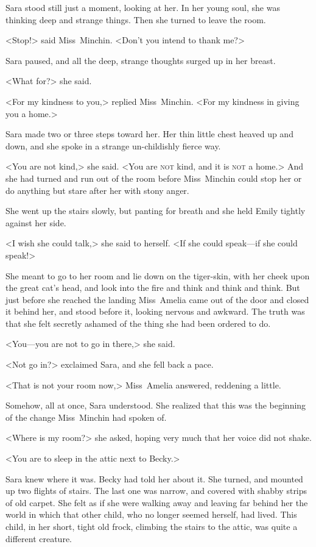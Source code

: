 Sara stood still just a moment, looking at her. In her young soul, she was thinking deep and strange things. Then she turned to leave the room.

<Stop!> said Miss~Minchin. <Don't you intend to thank me?>

Sara paused, and all the deep, strange thoughts surged up in her breast.

<What for?> she said.

<For my kindness to you,> replied Miss~Minchin. <For my kindness in giving you a home.>

Sara made two or three steps toward her. Her thin little chest heaved up and down, and she spoke in a strange un-childishly fierce way.

<You are not kind,> she said. <You are \textsc{not} kind, and it is \textsc{not} a home.> And she had turned and run out of the room before Miss~Minchin could stop her or do anything but stare after her with stony anger.

She went up the stairs slowly, but panting for breath and she held Emily tightly against her side.

<I wish she could talk,> she said to herself. <If she could speak—if she could speak!>

She meant to go to her room and lie down on the tiger-skin, with her cheek upon the great cat's head, and look into the fire and think and think and think. But just before she reached the landing Miss~Amelia came out of the door and closed it behind her, and stood before it, looking nervous and awkward. The truth was that she felt secretly ashamed of the thing she had been ordered to do.

<You—you are not to go in there,> she said.

<Not go in?> exclaimed Sara, and she fell back a pace.

<That is not your room now,> Miss~Amelia answered, reddening a little.

Somehow, all at once, Sara understood. She realized that this was the beginning of the change Miss~Minchin had spoken of.

<Where is my room?> she asked, hoping very much that her voice did not shake.

<You are to sleep in the attic next to Becky.>

Sara knew where it was. Becky had told her about it. She turned, and mounted up two flights of stairs. The last one was narrow, and covered with shabby strips of old carpet. She felt as if she were walking away and leaving far behind her the world in which that other child, who no longer seemed herself, had lived. This child, in her short, tight old frock, climbing the stairs to the attic, was quite a different creature.


